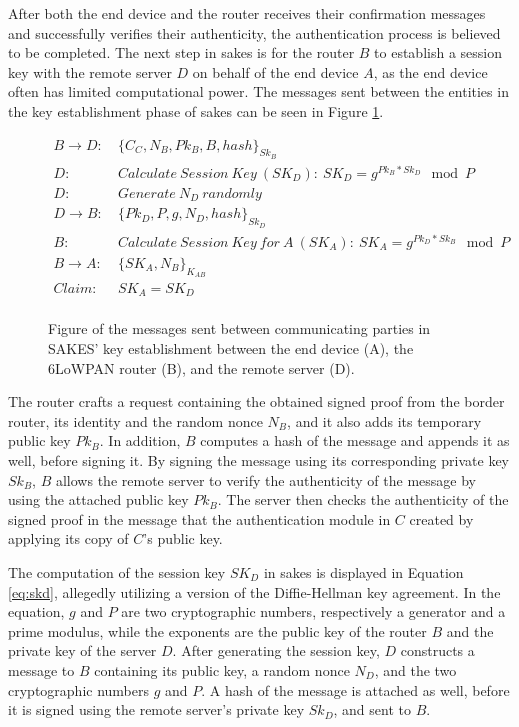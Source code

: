 After both the end device and the router receives their confirmation messages and successfully verifies their authenticity, the authentication process is believed to be completed. The next step in \gls{sakes} is for the router $B$ to establish a session key with the remote server $D$ on behalf of the end device $A$, as the end device often has limited computational power. The messages sent between the entities in the key establishment phase of \gls{sakes} can be seen in Figure \ref{fig:sakes-keys}.

\begin{figure}[h]
\begin{tcolorbox}[title=Key Establishment in SAKES]
\begin{align*}
B \rightarrow D:\ & \{C_C, N_B, Pk_B, B, hash\}_{Sk_B} \\
D:\ & Calculate\ Session\ Key\ (SK_D):\ SK_D = g^{Pk_B * Sk_D} \mod{P}\\
D:\ & Generate\ N_D\ randomly\\
D \rightarrow B:\ & \{Pk_D, P, g, N_D, hash\}_{Sk_D}\\
B:\ & Calculate\ Session\ Key\ for\ A\ (SK_A):\ SK_A = g^{Pk_D * Sk_B} \mod{P}\\
B \rightarrow A:\ & \{SK_A, N_B\}_{K_{AB}}\\
Claim:\ & SK_A = SK_D\\
\end{align*}
\end{tcolorbox}
\caption{Figure of the messages sent between communicating parties in SAKES' key establishment between the end device (A), the 6LoWPAN router (B), and the remote server (D).}
\label{fig:sakes-keys}
\end{figure}

The router crafts a request containing the obtained signed proof from the border router, its identity and the random nonce $N_B$, and it also adds its temporary public key $Pk_B$. In addition, $B$ computes a hash of the message and appends it as well, before signing it. By signing the message using its corresponding private key $Sk_B$, $B$ allows the remote server to verify the authenticity of the message by using the attached public key $Pk_B$. The server then checks the authenticity of the signed proof in the message that the authentication module in $C$ created by applying its copy of $C$'s public key.

The computation of the session key $SK_D$ in \gls{sakes} is displayed in Equation \ref{eq:skd}, allegedly utilizing a version of the Diffie-Hellman key agreement. In the equation, $g$ and $P$ are two cryptographic numbers, respectively a generator and a prime modulus, while the exponents are the public key of the router $B$ and the private key of the server $D$. After generating the session key, $D$ constructs a message to $B$ containing its public key, a random nonce $N_D$, and the two cryptographic numbers $g$ and $P$. A hash of the message is attached as well, before it is signed using the remote server's private key $Sk_D$, and sent to $B$. 

